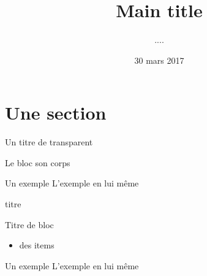 \documentclass{beamer}
\title[Short title]{Main title} %
\author{....} %
\institute{}
\date{30 mars 2017}
\newcommand{\befitem}{\vspace{-0.6cm}}
\begin{document}
{
\frame{
\thispagestyle{empty}
\titlepage}}
\LogoOff{}


\section{Une section}
\begin{frame}{Un titre de transparent}
	\begin{block}{Le bloc}
        son corps
	\end{block}
	
	\begin{exampleblock}{Un exemple}
	    L'exemple en lui même
	\end{exampleblock}
\end{frame}

\begin{frame}{titre}	
	\begin{block}{Titre de bloc}\befitem
		\begin{itemize}
		\item des items
		\end{itemize}
	\end{block}
	
	\begin{exampleblock}{Un exemple}
        L'exemple en lui même
	\end{exampleblock}
\end{frame}


{
\frame{
\thispagestyle{empty}
\titlepage}}
\LogoOff{}

\end{document}
